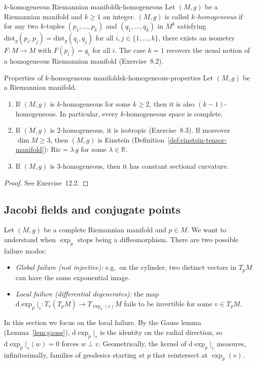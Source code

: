 \begin{colordef}{$k$-homogeneous Riemannian manifold}{k-homogeneous}
Let $(M, g)$ be a Riemannian manifold and $k \geqslant 1$ an integer. $(M, g)$ is called \emph{$k$-homogeneous} if for any two $k$-tuples $(p_1, \ldots, p_k)$ and $(q_1, \ldots, q_k)$ in $M^k$ satisfying $\mathrm{dist}_g(p_i, p_j) = \mathrm{dist}_g(q_i, q_j)$ for all $i, j \in \{1, \ldots, k\}$, there exists an isometry $F \colon M \to M$ with $F(p_i) = q_i$ for all $i$. The case $k = 1$ recovers the usual notion of a homogeneous Riemannian manifold (Exercise~8.2).
\end{colordef}

\begin{colorlem}{Properties of $k$-homogeneous manifolds}{k-homogeneous-properties}
Let $(M, g)$ be a Riemannian manifold.
\begin{enumerate}
    \item[(a)] If $(M, g)$ is $k$-homogeneous for some $k \geqslant 2$, then it is also $(k-1)$-homogeneous. In particular, every $k$-homogeneous space is complete.
    \item[(b)] If $(M, g)$ is 2-homogeneous, it is isotropic (Exercise~8.3). If moreover $\dim M \geqslant 3$, then $(M, g)$ is Einstein (Definition~\ref{def:einstein-tensor-manifold}): $\mathrm{Ric} = \lambda\, g$ for some $\lambda \in \mathbb{R}$.
    \item[(c)] If $(M, g)$ is 3-homogeneous, then it has constant sectional curvature.
\end{enumerate}
\end{colorlem}

\begin{proof}
See Exercise~12.2.
\end{proof}

\subsection{Jacobi fields and conjugate points}



Let $(M, g)$ be a complete Riemannian manifold and $p \in M$. We want to understand when $\exp_p$ stops being a diffeomorphism. There are two possible failure modes:
\begin{itemize}
    \item \emph{Global failure (not injective):} e.g.\ on the cylinder, two distinct vectors in $T_p M$ can have the same exponential image.
    \item \emph{Local failure (differential degenerates):} the map $\mathrm{d}\exp_p\big|_v \colon T_v(T_p M) \to T_{\exp_p(v)} M$ fails to be invertible for some $v \in T_p M$.
\end{itemize}
In this section we focus on the local failure. By the Gauss lemma (Lemma~\ref{lem:gauss}), $\mathrm{d}\exp_p\big|_v$ is the identity on the radial direction, so $\mathrm{d}\exp_p\big|_v(w) = 0$ forces $w \perp v$. Geometrically, the kernel of $\mathrm{d}\exp_p\big|_v$ measures, infinitesimally, families of geodesics starting at $p$ that reintersect at $\exp_p(v)$.

